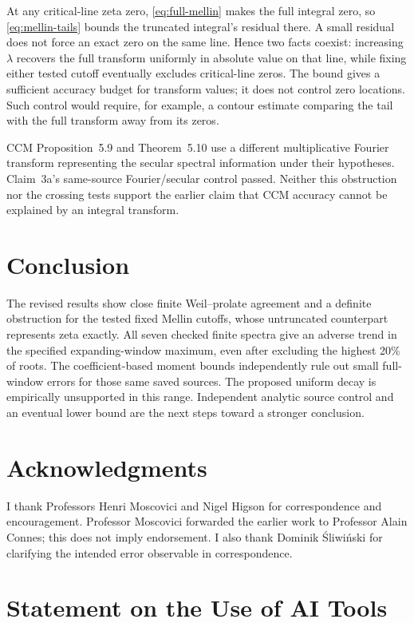 \documentclass[11pt,a4paper]{article}
\begin{document}
At any critical-line zeta zero, \eqref{eq:full-mellin} makes the full
integral zero, so \eqref{eq:mellin-tails} bounds the truncated integral's
residual there. A small residual does not force an exact zero on the
same line. Hence two facts coexist: increasing $\lambda$ recovers the
full transform uniformly in absolute value on that line, while fixing
either tested cutoff eventually excludes critical-line zeros.
The bound gives a sufficient accuracy budget for transform values;
it does not control zero locations. Such control would require, for
example, a contour estimate comparing the tail with the full transform
away from its zeros.

CCM Proposition~5.9 and Theorem~5.10 use a different multiplicative
Fourier transform representing the secular spectral information under
their hypotheses. Claim~3a's same-source Fourier/secular control passed.
Neither this obstruction nor the crossing tests support the earlier
claim that CCM accuracy cannot be explained by an integral transform.

\section{Conclusion}

The revised results show close finite Weil--prolate agreement and a
definite obstruction for the tested fixed Mellin cutoffs, whose
untruncated counterpart represents zeta exactly.
All seven checked finite spectra give an adverse trend in the specified
expanding-window maximum, even after excluding the highest 20\% of roots.
The coefficient-based moment bounds independently rule out small
full-window errors for those same saved sources.
The proposed uniform decay is empirically unsupported in this range.
Independent analytic source control and an eventual lower bound are
the next steps toward a stronger conclusion.

\section*{Acknowledgments}

I thank Professors Henri Moscovici and Nigel Higson for correspondence
and encouragement. Professor Moscovici forwarded the earlier work to
Professor Alain Connes; this does not imply endorsement.
I also thank Dominik \'Sliwi\'nski for clarifying the intended error
observable in correspondence.

\newpage
\section*{Statement on the Use of AI Tools}
\end{document}
